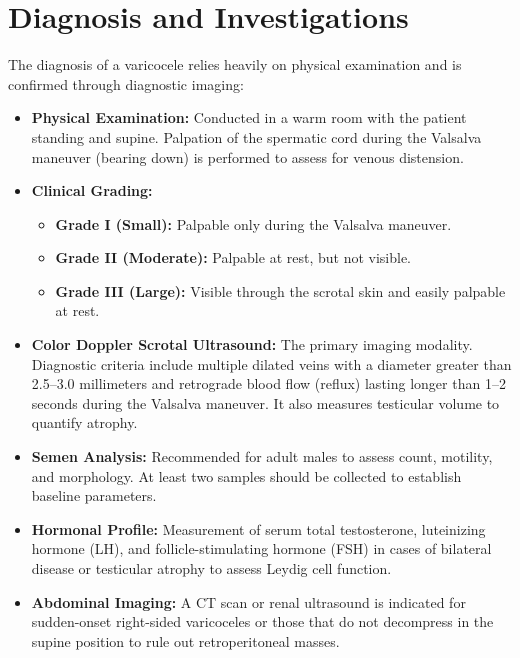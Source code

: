 \section*{Diagnosis and Investigations}
The diagnosis of a varicocele relies heavily on physical examination and is confirmed through diagnostic imaging:
\begin{itemize}
  \item \textbf{Physical Examination:} Conducted in a warm room with the patient standing and supine. Palpation of the spermatic cord during the Valsalva maneuver (bearing down) is performed to assess for venous distension.
  \item \textbf{Clinical Grading:}
  \begin{itemize}
    \item \textbf{Grade I (Small):} Palpable only during the Valsalva maneuver.
    \item \textbf{Grade II (Moderate):} Palpable at rest, but not visible.
    \item \textbf{Grade III (Large):} Visible through the scrotal skin and easily palpable at rest.
  \end{itemize}
  \item \textbf{Color Doppler Scrotal Ultrasound:} The primary imaging modality. Diagnostic criteria include multiple dilated veins with a diameter greater than 2.5--3.0 millimeters and retrograde blood flow (reflux) lasting longer than 1--2 seconds during the Valsalva maneuver. It also measures testicular volume to quantify atrophy.
  \item \textbf{Semen Analysis:} Recommended for adult males to assess count, motility, and morphology. At least two samples should be collected to establish baseline parameters.
  \item \textbf{Hormonal Profile:} Measurement of serum total testosterone, luteinizing hormone (LH), and follicle-stimulating hormone (FSH) in cases of bilateral disease or testicular atrophy to assess Leydig cell function.
  \item \textbf{Abdominal Imaging:} A CT scan or renal ultrasound is indicated for sudden-onset right-sided varicoceles or those that do not decompress in the supine position to rule out retroperitoneal masses.
\end{itemize}

